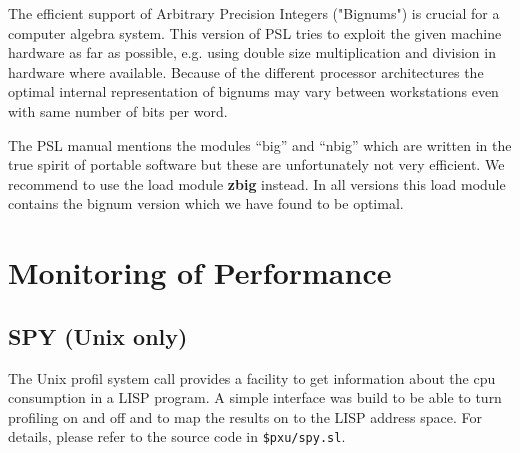 The efficient support of Arbitrary Precision Integers ("Bignums")
is crucial for a computer algebra system. This version of PSL tries to
exploit the given machine hardware as far as possible, e.g. using double
size multiplication and division in hardware where available. Because of
the different processor architectures the optimal internal representation 
of bignums may vary between workstations even with same number 
of bits per word. 

The PSL manual mentions the modules ``big'' and ``nbig'' which are
written in the true spirit of portable software but these are unfortunately
not very efficient. We recommend to use the load module
{\bf zbig} instead. In all versions this load module contains 
the bignum version which we have found to be optimal.

\section{Monitoring of Performance}

\subsection{SPY (Unix only)}

The Unix profil system call provides a facility to get information 
about the cpu consumption in a LISP program. A simple interface was
build to be able to turn profiling on and off and to map the results
on to the LISP address space. For details, please refer to the source
code in \verb+$pxu/spy.sl+.
\\




